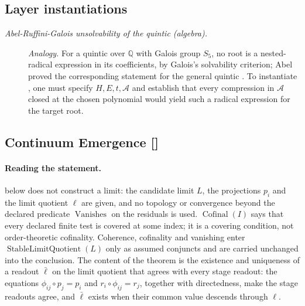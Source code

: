 \subsection*{Layer instantiations}\label{layer-inst:F42}

\begingroup\small
\begin{description}
\item[\emph{Abel-Ruffini-Galois unsolvability of the
quintic (algebra).}] \textit{Analogy.}
For a quintic over \(\mathbb Q\) with Galois group \(S_5\), no
root is a nested-radical expression in its coefficients, by Galois's solvability criterion; Abel proved the corresponding statement for the general quintic \citep{Abel1824Quintic,Galois1846Memoire}. To instantiate , one must
specify \(H,E,t,\mathcal A\) and establish that every compression
in \(\mathcal A\) closed at the chosen polynomial would yield such
a radical expression for the target root.

\end{description}
\endgroup


\subsection{Continuum Emergence [\texorpdfstring{}{F43}]}\label{sec:self-reference-limits:continuum-emergence}

\paragraph{Reading the statement.}  below does not
construct a limit: the candidate limit \(L\), the projections \(p_i\) and
the limit quotient \(\ell\) are given, and no topology or convergence
beyond the declared predicate \(\operatorname{Vanishes}\) on the
residuals is used.  \(\operatorname{Cofinal}(I)\) says that every
declared finite test is covered at some index; it is a covering
condition, not order-theoretic cofinality.  Coherence, cofinality and
vanishing enter \(\operatorname{StableLimitQuotient}(L)\) only as
assumed conjuncts and are carried unchanged into the conclusion.  The
content of the theorem is the existence and uniqueness of a readout
\(\bar\ell\) on the limit quotient that agrees with every stage readout:
the equations \(\phi_{ij}\circ p_j=p_i\) and \(r_i\circ\phi_{ij}=r_j\),
together with directedness, make the stage readouts agree, and
\(\bar\ell\) exists when their common value descends through \(\ell\).

